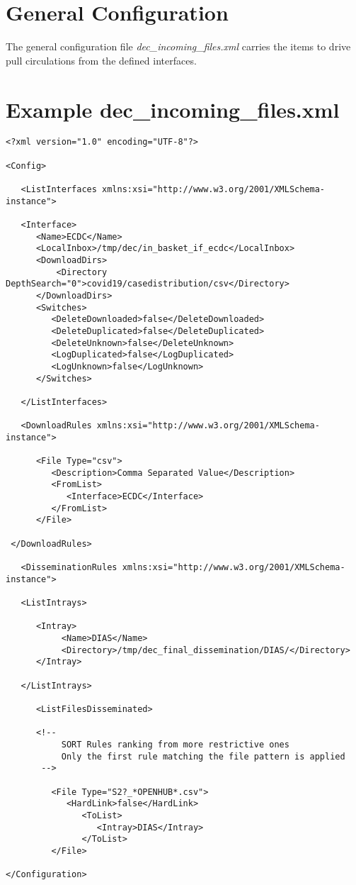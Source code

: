 \documentclass[dec_sum_main.tex]{subfiles}
\begin{document}
\section{General Configuration}
 
\par
\noindent
The general configuration file \textit{dec\_incoming\_files.xml} carries the items to drive pull circulations from the defined interfaces.


\label{decincomingfilesxml}
\section{Example dec\_incoming\_files.xml}
\begin{verbatim}
<?xml version="1.0" encoding="UTF-8"?>

<Config>

   <ListInterfaces xmlns:xsi="http://www.w3.org/2001/XMLSchema-instance">

   <Interface>
      <Name>ECDC</Name>
      <LocalInbox>/tmp/dec/in_basket_if_ecdc</LocalInbox>
      <DownloadDirs>
          <Directory DepthSearch="0">covid19/casedistribution/csv</Directory>
      </DownloadDirs>
      <Switches>
         <DeleteDownloaded>false</DeleteDownloaded>
         <DeleteDuplicated>false</DeleteDuplicated>
         <DeleteUnknown>false</DeleteUnknown>
         <LogDuplicated>false</LogDuplicated>
         <LogUnknown>false</LogUnknown>
      </Switches>
   
   </ListInterfaces>

   <DownloadRules xmlns:xsi="http://www.w3.org/2001/XMLSchema-instance">

      <File Type="csv">
         <Description>Comma Separated Value</Description>
         <FromList>
            <Interface>ECDC</Interface>
         </FromList>
      </File>

 </DownloadRules>

   <DisseminationRules xmlns:xsi="http://www.w3.org/2001/XMLSchema-instance">

   <ListIntrays>

      <Intray>
		   <Name>DIAS</Name>
           <Directory>/tmp/dec_final_dissemination/DIAS/</Directory>
      </Intray>

   </ListIntrays>

      <ListFilesDisseminated>

	  <!--
           SORT Rules ranking from more restrictive ones    
           Only the first rule matching the file pattern is applied     
       -->

         <File Type="S2?_*OPENHUB*.csv">
            <HardLink>false</HardLink>
               <ToList>
                  <Intray>DIAS</Intray>
               </ToList>
         </File>

</Configuration>

\end{verbatim}
\end{document}
